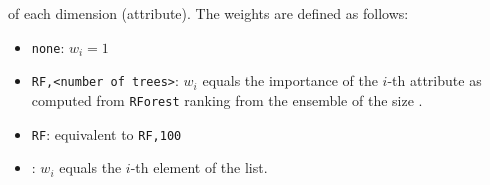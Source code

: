 \begin{itemize}
\begin{itemize}
        of each dimension (attribute). The weights are defined as follows:
        \begin{itemize}
            \item {\tt none}: $w_i = 1$
            \item {\tt RF,<number of trees>}: $w_i$ equals the importance of the $i$-th attribute as computed from {\tt RForest} ranking from the ensemble
            of the size {\tt <number of trees>}.
            \item {\tt RF}: equivalent to {\tt RF,100}
            \item {\tt <explicitly given list of weights>}: $w_i$ equals the $i$-th element of the list.
        \end{itemize}
    \end{itemize}
\end{itemize}